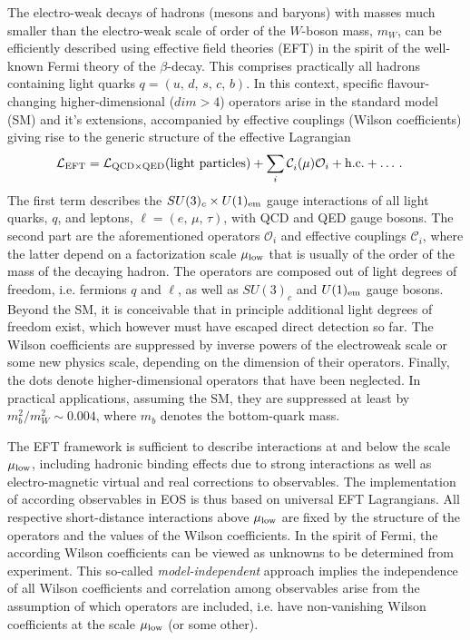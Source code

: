 
\newcommand{\op}[1]{\mathcal{O}_{#1}}
\newcommand{\wilson}[2][{}]{\mathcal{C}_{#2}^{\mathrm{#1}}}

%
%

The electro-weak decays of hadrons (mesons and baryons) with masses much smaller
than the electro-weak scale of order of the $W$-boson mass, $m_W$, can be efficiently
described using effective field theories (EFT) in the spirit of the well-known
Fermi theory of the $\beta$-decay. This comprises practically all hadrons containing
light quarks $q = (u,\,d,\,s,\,c,\,b)$. In this context, specific flavour-changing
higher-dimensional ($dim > 4$) operators arise in the standard model (SM) and
it's extensions, accompanied by effective couplings (Wilson coefficients) giving
rise to the generic structure of the effective Lagrangian
\begin{align}
  {\cal L}_{\rm EFT} &
  = {\cal L}_{{\rm QCD} \times {\rm QED}} (\mbox{light particles})
  + \sum_i \wilson{i}(\mu) \op{i} + \mbox{h.c.} + \ldots \,.
\end{align} 
The first term describes the $SU(3)_c \times U(1)_{\rm em}$
gauge interactions of all light quarks, $q$, and leptons, $\ell = (e,\,\mu,\,\tau)$,
with QCD and QED gauge bosons. The second part are the aforementioned operators
$\op{i}$ and effective couplings $\wilson{i}$, where the latter depend on a
factorization scale $\mu_{\rm low}$ that is usually of the order of the mass of the
decaying hadron. The operators are composed out of light degrees of freedom, i.e. fermions
$q$ and $\ell$, as well as $SU(3)_c$ and $U(1)_{\rm em}$ gauge bosons. Beyond
the SM, it is conceivable that in principle additional light degrees of freedom
exist, which however must have escaped direct detection so far.
The Wilson coefficients are suppressed by inverse powers of the electroweak
scale or some new physics scale, depending on the dimension of their operators.
Finally, the dots denote higher-dimensional operators that have been neglected.
In practical applications, assuming the SM, they are suppressed at least by
$m_b^2/m_W^2 \sim 0.004$, where $m_b$ denotes the bottom-quark mass.

The EFT framework is sufficient to describe interactions at and below the scale
$\mu_{\rm low}$, including hadronic binding effects due to strong interactions
as well as electro-magnetic virtual and real corrections to observables. The
implementation of according observables in EOS is thus based on universal EFT 
Lagrangians. All respective short-distance interactions above $\mu_{\rm low}$ are
fixed by the structure of the operators and the values of the Wilson coefficients.
In the spirit of Fermi, the according Wilson coefficients can be viewed as unknowns
to be determined from experiment. This so-called {\em model-independent} approach
implies the independence of all Wilson coefficients and correlation among observables
arise from the assumption of which operators are included, i.e. have non-vanishing
Wilson coefficients at the scale $\mu_{\rm low}$ (or some other). 


